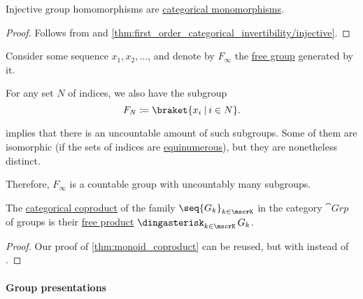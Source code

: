 \begin{corollary}\label{thm:injective_group_homomorphisms_are_monomorphisms}
  Injective group homomorphisms are \hyperref[def:morphism_invertibility/left_cancellative]{categorical monomorphisms}.
\end{corollary}
\begin{proof}
  Follows from  and \cref{thm:first_order_categorical_invertibility/injective}.
\end{proof}

\begin{example}\label{ex:free_group_with_uncountably_many_subgroups}
  Consider some sequence \( x_1, x_2, \ldots \), and denote by \( F_\infty \) the \hyperref[def:free_group]{free group} generated by it.

  For any set \( N \) of indices, we also have the subgroup
  \begin{equation*}
    F_N \coloneqq \braket{ x_i \given i \in N }.
  \end{equation*}

   implies that there is an uncountable amount of such subgroups. Some of them are isomorphic (if the sets of indices are \hyperref[def:equinumerosity]{equinumerous}), but they are nonetheless distinct.

  Therefore, \( F_\infty \) is a countable group with uncountably many subgroups.
\end{example}

\begin{proposition}\label{thm:group_coproduct}
  The \hyperref[def:discrete_category_limits]{categorical coproduct} of the family \( \seq{ G_k }_{k \in \mscrK} \) in the category \hyperref[def:group/category]{\( \cat{Grp} \)} of groups is their \hyperref[def:monoid_free_product]{free product} \( \Ast_{k \in \mscrK} G_k \).
\end{proposition}
\begin{proof}
  Our proof of \cref{thm:monoid_coproduct} can be reused, but with  instead of .
\end{proof}

\paragraph{Group presentations}

